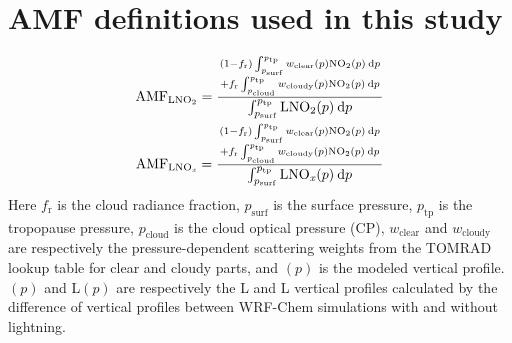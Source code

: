 \documentclass[amt]{copernicus}
\begin{document}
\hack{\clearpage}

\appendix
\section{AMF definitions used in this study} \label{AppendixA}

\begin{gather}
\mathrm{AMF}_{\chem{LNO_2}} = \displaystyle{{(1-f_\mathrm{r}) \int_{p_\mathrm{surf}}^{p_\mathrm{ tp}} w_\mathrm{clear}(p) \chem{NO_2}(p) \: \mathrm{d}p \atop+ f_\mathrm{r} \int_{p_\mathrm{cloud}}^{p_\mathrm{tp}} w_\mathrm{cloudy}(p) \chem{NO_2}(p) \: \mathrm{d}p}\over{\int_{p_\mathrm{surf}}^{p_\mathrm{tp}} \chem{LNO_2}(p) \: \mathrm{d}p}}\\
\mathrm{AMF}_{\chem{LNO_\mathit{x}}} = \displaystyle{{(1-f_\mathrm{r}) \int_{p_\mathrm{surf}}^{p_\mathrm{tp}} w_\mathrm{clear}(p) \chem{NO_2}(p) \: \mathrm{d}p \atop+ f_\mathrm{r} \int_{p_\mathrm{cloud}}^{p_\mathrm{tp}} w_\mathrm{cloudy}(p) \chem{NO_2}(p) \: \mathrm{d}p}\over{\int_{p_\mathrm{surf}}^{p_\mathrm{tp}} \chem{LNO_\mathit{x}}(p) \: \mathrm{d}p}}
\end{gather}
Here $f_\mathrm{r}$ is the cloud radiance fraction, $p_\mathrm{surf}$ is the surface pressure, $p_\mathrm{tp}$ is the tropopause pressure, $p_\mathrm{cloud}$ is the cloud optical pressure (CP), $w_\mathrm{clear}$ and $w_\mathrm{cloudy}$ are respectively the pressure-dependent scattering weights from the TOMRAD lookup table \citep{Bucsela.2013}  for clear and cloudy parts, and $(p)$ is the modeled  vertical profile.
$(p)$ and L$(p)$ are respectively the L and L vertical profiles calculated by the difference of vertical profiles between WRF-Chem simulations with and without lightning.
\end{document}
